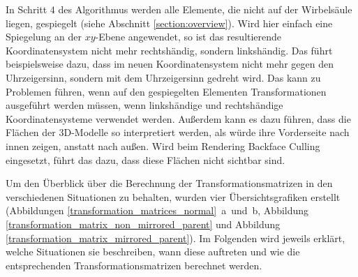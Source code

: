 In Schritt $4$ des Algorithmus werden \zb alle Elemente, die nicht auf der Wirbelsäule liegen, gespiegelt (siehe Abschnitt \ref{section:overview}). Wird hier einfach eine Spiegelung an der $xy$-Ebene angewendet, so ist das resultierende Koordinatensystem nicht mehr rechtshändig, sondern linkshändig.
Das führt beispielsweise dazu, dass im neuen Koordinatensystem nicht mehr gegen den Uhrzeigersinn, sondern mit dem Uhrzeigersinn gedreht wird. Das kann zu Problemen führen, wenn auf den gespiegelten Elementen Transformationen ausgeführt werden müssen, \va wenn linkshändige und rechtshändige Koordinatensysteme verwendet werden. Außerdem kann es dazu führen, dass die Flächen der 3D-Modelle so interpretiert werden, als würde ihre Vorderseite nach innen zeigen, anstatt nach außen. Wird beim Rendering Backface Culling \cite{backfaceCulling} eingesetzt, führt das dazu, dass diese Flächen nicht sichtbar sind.

Um den Überblick über die Berechnung der Transformationsmatrizen in den verschiedenen Situationen zu behalten, wurden vier Übersichtsgrafiken erstellt (Abbildungen \mbox{\ref{transformation_matrices_normal} a und b}, Abbildung \ref{transformation_matrix_non_mirrored_parent} und Abbildung \ref{transformation_matrix_mirrored_parent}). 
Im Folgenden wird jeweils erklärt, welche Situationen sie beschreiben, wann diese auftreten und wie die entsprechenden Transformationsmatrizen berechnet werden.

